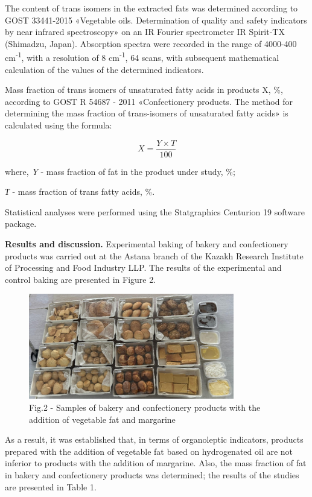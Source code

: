 \begin{multicols}{2}
The content of trans isomers in the extracted fats was determined
according to GOST 33441-2015 «Vegetable oils. Determination of quality
and safety indicators by near infrared spectroscopy» on an IR Fourier
spectrometer IR Spirit-TX (Shimadzu, Japan). Absorption spectra were
recorded in the range of 4000-400 cm\textsuperscript{-1}, with a
resolution of 8 cm\textsuperscript{-1}, 64 scans, with subsequent
mathematical calculation of the values of the determined indicators.

Mass fraction of trans isomers of unsaturated fatty acids in products X,
\%, according to GOST R 54687 - 2011 «Confectionery products. The method
for determining the mass fraction of trans-isomers of unsaturated fatty
acids» is calculated using the formula:

\begin{equation}
X = \frac{Y \times T}{100}
\end{equation}

where, \emph{Y} - mass fraction of fat in the product under study, \%;

\emph{Т} - mass fraction of trans fatty acids, \%.

Statistical analyses were performed using the Statgraphics Centurion 19
software package.

{\bfseries Results and discussion.} Experimental baking of bakery and
confectionery products was carried out at the Astana branch of the
Kazakh Research Institute of Processing and Food Industry LLP. The
results of the experimental and control baking are presented in Figure
2. 
\end{multicols}

\begin{figure}[H]
	\centering
	\includegraphics[width=0.8\textwidth]{media/pish/image11}
	\caption*{Fig.2 - Samples of bakery and confectionery products with the addition of vegetable fat and margarine}
\end{figure}

As a result, it was established that, in terms of organoleptic
indicators, products prepared with the addition of vegetable fat based
on hydrogenated oil are not inferior to products with the addition of
margarine. Also, the mass fraction of fat in bakery and confectionery
products was determined; the results of the studies are presented in
Table 1.

